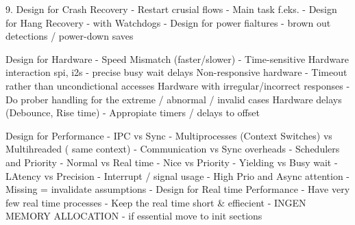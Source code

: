 9. Design for Crash Recovery
- Restart crusial flows - Main task f.eks.
- Design for Hang Recovery - with Watchdogs
- Design for power fialtures - brown out detections / power-down saves

Design for Hardware
- Speed Mismatch (faster/slower)
- Time-sensitive Hardware interaction spi, i2s - precise busy wait delays
Non-responsive hardware
- Timeout rather than uncondictional accesses
 Hardware with irregular/incorrect responses
- Do prober handling for the extreme / abnormal / invalid cases
Hardware delays (Debounce, Rise time)
- Appropiate timers / delays to offset

Design for Performance
- IPC vs Sync
    - Multiprocesses (Context Switches) vs Multihreaded ( same context)
    - Communication vs Sync overheads
- Schedulers and Priority
    - Normal vs Real time
    - Nice vs Priority
- Yielding vs Busy wait
    - LAtency vs Precision
- Interrupt / signal usage
    - High Prio and Async attention
    - Missing = invalidate assumptions
- Design for Real time Performance
- Have very few real time processes
- Keep the real time short \& effiecient
    - INGEN MEMORY ALLOCATION
    - if essential move to init sections
    